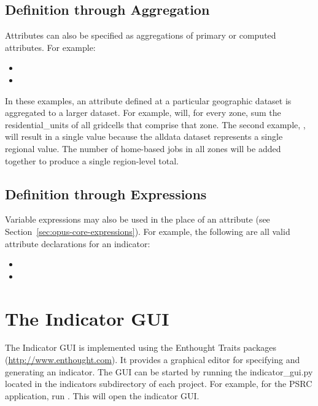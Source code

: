 \subsection{Definition through Aggregation}

Attributes can also be specified as aggregations of primary or computed
attributes. For example:

\begin{itemize}
\tight
\item {}
\item {}
\end{itemize}

In these examples, an attribute defined at a particular geographic dataset is
aggregated to a larger dataset. For example,
 will, for
every zone, sum the residential_units of all gridcells that comprise that zone. 
The second example,
, will
result in a single value because the alldata dataset represents a single
regional value. The number of home-based jobs in all zones will be added
together to produce a single region-level total. 

\subsection{Definition through Expressions}

Variable expressions may also be used in the place of an attribute 
(see Section~\ref{sec:opus-core-expressions}). For example, the following are
all valid attribute declarations for an indicator: 

\begin{itemize}
\tight
\item {}
\item {}
\end{itemize}

\section{The Indicator GUI}
\label{sec:indicator-configuration-gui}

The Indicator GUI is implemented using the Enthought Traits packages
(\url{http://www.enthought.com}).  It provides a graphical editor for
specifying and generating an indicator.  The GUI can be started by running
the indicator_gui.py located in the indicators subdirectory of each
project. For example, for the PSRC application, run
.  This will open the indicator GUI.

